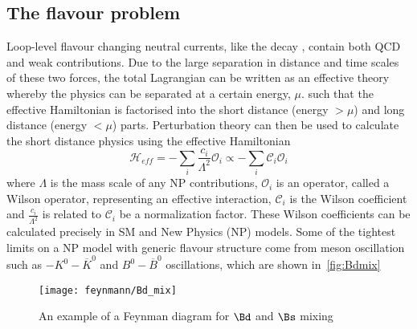 \subsection{The flavour problem}
\label{subsec:mfv}
Loop-level flavour changing neutral currents, like the decay \Lbpi, contain both QCD and weak contributions. Due to the large separation in distance and time scales of these two forces, the total Lagrangian can be written as an effective theory whereby the physics can be separated at a certain energy, $\mu$. such that the effective Hamiltonian is factorised into the short distance (energy $>\mu$) and long distance (energy $<\mu$) parts. Perturbation theory can then be used to calculate the short distance physics using the effective Hamiltonian
\begin{equation}
  \mathcal{H}_{eff} = -\sum_{i}\frac{c_{i}}{\Lambda^{2}}\mathcal{O}_{i} \propto -\sum_{i}\mathcal{C}_{i}\mathcal{O}_{i}
\end{equation}
where $\Lambda$ is the mass scale of any NP contributions, $\mathcal{O}_{i}$ is an operator, called a Wilson operator, representing an effective interaction, $\mathcal{C}_{i}$ is the Wilson coefficient and $\frac{c_{i}}{\Lambda^{2}}$ is related to $\mathcal{C}_{i}$ be a normalization factor.
These Wilson coefficients can be calculated precisely in SM and New Physics (NP) models. Some of the tightest limits on a NP model with generic flavour structure come from meson oscillation such as $-K^{0} - \overline{K}^{0}$ and $B^{0} - \overline{B}^{0}$ oscillations, which are shown in~\autoref{fig:Bdmix}
\begin{figure}[!h]\def\nh{0.5\textwidth}
  \centering
  \texttt{[image: feynmann/Bd\_mix]}
  \caption{An example of a Feynman diagram for $\Bd$ and $\Bs$ mixing}
  \label{fig:Bdmix}
\end{figure}

